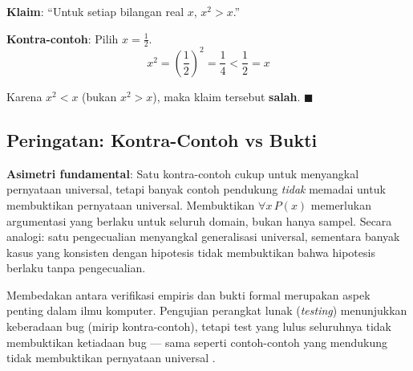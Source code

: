 \begin{contoh}
\textbf{Klaim}: ``Untuk setiap bilangan real $x$, $x^2 > x$.''

\textbf{Kontra-contoh}: Pilih $x = \frac{1}{2}$.
\[ x^2 = \left(\frac{1}{2}\right)^2 = \frac{1}{4} < \frac{1}{2} = x \]

Karena $x^2 < x$ (bukan $x^2 > x$), maka klaim tersebut \textbf{salah}. $\blacksquare$
\end{contoh}

\subsection{Peringatan: Kontra-Contoh vs Bukti}

\begin{konsep}
\textbf{Asimetri fundamental}: Satu kontra-contoh cukup untuk menyangkal pernyataan universal, tetapi banyak contoh pendukung \emph{tidak} memadai untuk membuktikan pernyataan universal. Membuktikan $\forall x\, P(x)$ memerlukan argumentasi yang berlaku untuk seluruh domain, bukan hanya sampel. Secara analogi: satu pengecualian menyangkal generalisasi universal, sementara banyak kasus yang konsisten dengan hipotesis tidak membuktikan bahwa hipotesis berlaku tanpa pengecualian.
\end{konsep}

Membedakan antara verifikasi empiris dan bukti formal merupakan aspek penting dalam ilmu komputer. Pengujian perangkat lunak (\textit{testing}) menunjukkan keberadaan bug (mirip kontra-contoh), tetapi test yang lulus seluruhnya tidak membuktikan ketiadaan bug --- sama seperti contoh-contoh yang mendukung tidak membuktikan pernyataan universal \cite{velleman2019}.
